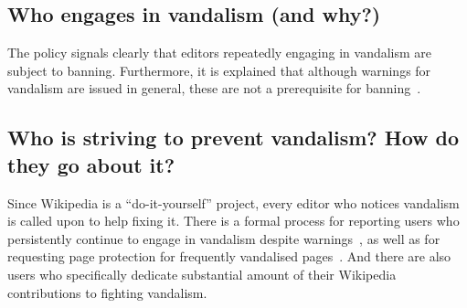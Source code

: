 \begin{comment}
The vandalism policy also cautions against using the ``vandalism'' label unless absolutely necessary since it tends to drive contributors away and prevent constructive discussions~\cite{Wikipedia:Vandalism}.

\begin{comment}
\url{https://en.wikipedia.org/wiki/Wikipedia:Vandalism}
"Careful consideration may be required to differentiate between edits that are beneficial, edits that are detrimental but well-intentioned, and edits that are vandalism."

\url{https://en.wikipedia.org/wiki/Wikipedia:Disruptive_editing}

"Disruptive editing is not always intentional. Editors may be accidentally disruptive because they don't understand how to correctly edit, or because they lack the social skills or competence necessary to work collaboratively "
Okay what are disruptive edits that are not vandalism? (apart from edit wars)

"Engages in "disruptive cite-tagging"; adds unjustified {{citation needed}} tags to an article when the content tagged is already sourced, uses such tags to suggest that properly sourced article content is questionable."
\end{comment}

\subsection{Who engages in vandalism (and why?)}

The policy signals clearly that editors repeatedly engaging in vandalism are subject to banning.
Furthermore, it is explained that although warnings for vandalism are issued in general, these are not a prerequisite for banning~\cite{Wikipedia:Vandalism}.

\subsection{Who is striving to prevent vandalism? How do they go about it?}

Since Wikipedia is a ``do-it-yourself'' project, every editor who notices vandalism is called upon to help fixing it.
There is a formal process for reporting users who persistently continue to engage in vandalism despite warnings~\cite{Wikipedia:AIV}, %
as well as for requesting page protection for frequently vandalised pages~\cite{Wikipedia:PageProtection}.
And there are also users who specifically dedicate substantial amount of their Wikipedia contributions to fighting vandalism.

